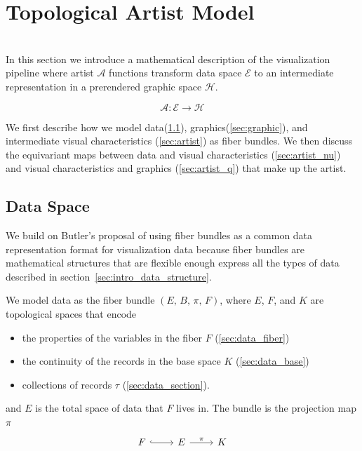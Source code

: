 \documentclass[../main.tex]{subfiles}
\begin{document}
\section{Topological Artist Model}
\\
In this section we introduce a mathematical description of the visualization pipeline where artist $\mathscr{A}$ functions transform data space $\mathscr{E}$ to an intermediate representation in a prerendered graphic space $\mathscr{H}$. 

\begin{equation}
    \label{eq:artist}
    \mathscr{A}: \mathscr{E} \rightarrow \mathscr{H}
\end{equation}

We first describe how we model data(\ref{sec:data}), graphics(\ref{sec:graphic}), and intermediate visual characteristics (\ref{sec:artist}) as fiber bundles. We then discuss the equivariant maps between data and visual characteristics (\ref{sec:artist_nu}) and visual characteristics and graphics (\ref{sec:artist_q}) that make up the artist.

\subsection{Data Space}
\label{sec:data}
We build on Butler's proposal of using fiber bundles as a common data representation format for visualization data\cite{butlerVectorBundleClassesForm1992, butlerVisualizationModelBased1989} because fiber bundles are mathematical structures that are flexible enough express all the types of data described in section~\ref{sec:intro_data_structure}.

We model data as the fiber bundle $(E,\,B,\,\pi ,\,F)$, where $E$, $F$, and $K$ are topological spaces that encode 
\begin{itemize}
\item the properties of the variables in the fiber $F$ (\ref{sec:data_fiber})
\item the continuity of the records in the base space $K$ (\ref{sec:data_base})
\item collections of records $\tau$ (\ref{sec:data_section}). 
\end{itemize}

and $E$ is the total space of data that $F$ lives in. The bundle is the projection map $\pi$
\begin{equation}
    \label{eq:fiber_bundle}
    \begin{tikzcd}
        F \arrow[r, hook] & E \arrow[r, "\pi"] & K
    \end{tikzcd}
\end{equation}
\end{document}
